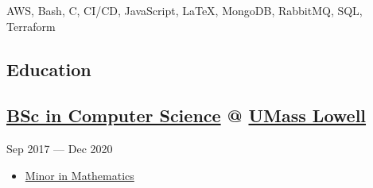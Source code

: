 \documentclass[11pt, letterpaper]{article}
\newcommand{\datedsubsection}[2]{
    \titleformat{\subsection}[runin]{\normalfont\normalsize\bfseries}{\thesection}{}{}
    \subsection*{#1}
    \hfill#2
    \titleformat{\subsection}[hang]{\normalfont\normalsize\bfseries}{\thesection}{}{}
}
\begin{document}
AWS, Bash, C, CI/CD, JavaScript, \LaTeX, MongoDB, RabbitMQ, SQL, Terraform


\textcolor{header}{\section*{Education}}\label{sec:education}

\datedsubsection{\href{https://www.uml.edu/catalog/undergraduate/sciences/departments/computer-science/computer-science-major.aspx}{BSc in Computer Science} @ \href{https://www.uml.edu/}{UMass Lowell}}{Sep 2017 --- Dec 2020}
\begin{itemize}
    \item \href{https://www.uml.edu/catalog/undergraduate/sciences/departments/mathematical-sciences/mathematical-sciences-minor.aspx}{Minor in Mathematics}
\end{itemize}
\end{document}
